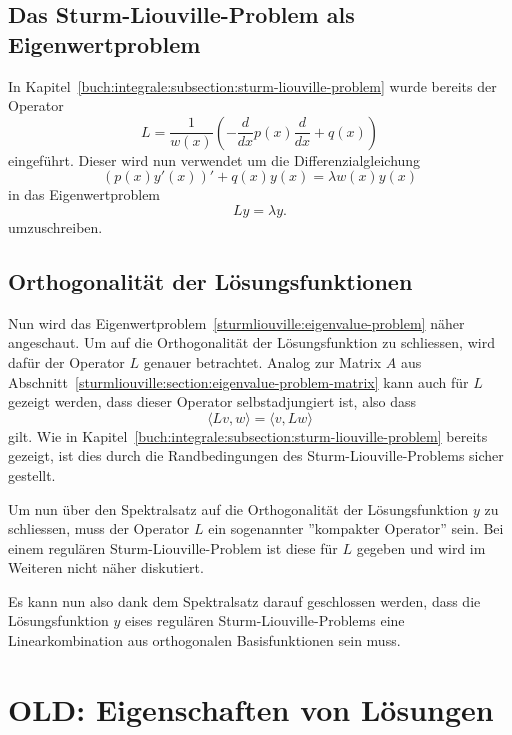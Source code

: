 \subsection{Das Sturm-Liouville-Problem als Eigenwertproblem}

In Kapitel~\ref{buch:integrale:subsection:sturm-liouville-problem} wurde bereits
der Operator
\[
    L
    =
    \frac{1}{w(x)}\left( -\frac{d}{dx}p(x) \frac{d}{dx} + q(x)\right)
\]
eingeführt.
Dieser wird nun verwendet um die Differenzialgleichung 
\[
    (p(x)y'(x))' + q(x)y(x)
    =
    \lambda w(x) y(x)
\]
in das Eigenwertproblem
\begin{equation}
    \label{sturmliouville:eigenvalue-problem}
    L y
    =
    \lambda y.
\end{equation}
umzuschreiben.

\subsection{Orthogonalität der Lösungsfunktionen}

Nun wird das Eigenwertproblem~\eqref{sturmliouville:eigenvalue-problem} näher
angeschaut.
Um auf die Orthogonalität der Lösungsfunktion zu schliessen, wird dafür der
Operator $L$ genauer betrachtet.
Analog zur Matrix $A$ aus 
Abschnitt~\ref{sturmliouville:section:eigenvalue-problem-matrix} kann auch für
$L$ gezeigt werden, dass dieser Operator selbstadjungiert ist, also dass
\[
    \langle L v, w\rangle
    =
    \langle v, L w\rangle
\]
gilt.
Wie in Kapitel~\ref{buch:integrale:subsection:sturm-liouville-problem} bereits
gezeigt, ist dies durch die Randbedingungen des Sturm-Liouville-Problems
sicher gestellt.

Um nun über den Spektralsatz auf die Orthogonalität der Lösungsfunktion $y$ zu
schliessen, muss der Operator $L$ ein sogenannter ''kompakter Operator'' sein.
Bei einem regulären Sturm-Liouville-Problem ist diese für $L$ gegeben und wird
im Weiteren nicht näher diskutiert.

Es kann nun also dank dem Spektralsatz darauf geschlossen werden, dass die
Lösungsfunktion $y$ eises regulären Sturm-Liouville-Problems eine
Linearkombination aus orthogonalen Basisfunktionen sein muss.


\iffalse

\section{OLD: Eigenschaften von Lösungen
}

